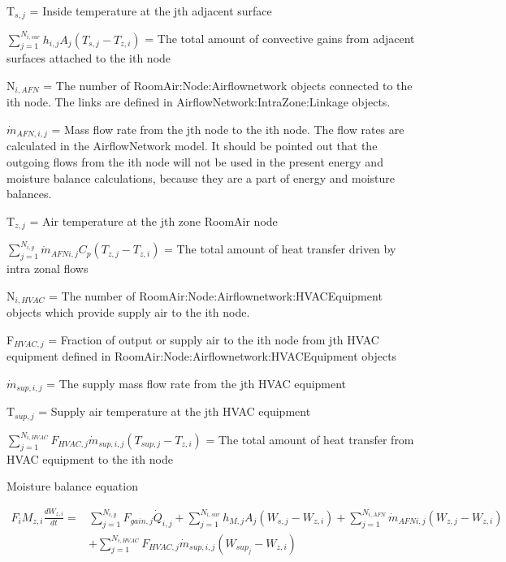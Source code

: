 T\(_{s,j}\) = Inside temperature at the jth adjacent surface

\({\sum\limits_{j = 1}^{N_{i,sur}} h_{i,j} A_j \left( T_{s,j} - T_{z,i}\right)}\) = The total amount of convective gains from adjacent surfaces attached to the ith node

N\(_{i,AFN}\) = The number of RoomAir:Node:Airflownetwork objects connected to the ith node. The links are defined in AirflowNetwork:IntraZone:Linkage objects.

\({\dot m}_{AFN,i,j}\) = Mass flow rate from the jth node to the ith node. The flow rates are calculated in the AirflowNetwork model. It should be pointed out that the outgoing flows from the ith node will not be used in the present energy and moisture balance calculations, because they are a part of energy and moisture balances.

T\(_{z,j}\) = Air temperature at the jth zone RoomAir node

\({\sum\limits_{j = 1}^{N_{i,g}} \dot m_{AFN i,j} {C_p}\left( T_{z,j} - T_{z,i} \right)}\) = The total amount of heat transfer driven by intra zonal flows

N\(_{i,HVAC}\) = The number of RoomAir:Node:Airflownetwork:HVACEquipment objects which provide supply air to the ith node.

F\(_{HVAC,j}\) = Fraction of output or supply air to the ith node from jth HVAC equipment defined in RoomAir:Node:Airflownetwork:HVACEquipment objects

\({\dot m}_{sup,i,j}\) = The supply mass flow rate from the jth HVAC equipment

T\(_{sup,j}\) = Supply air temperature at the jth HVAC equipment

\({\sum\limits_{j = 1}^{N_{i,HVAC}} F_{HVAC,j} \dot m_{sup,i,j} \left( T_{sup,j} - T_{z,i}\right)}\) = The total amount of heat transfer from HVAC equipment to the ith node

Moisture balance equation

\begin{equation}
\begin{split}
{F_i}{M_{z,i}}\frac{{d{W_{z,i}}}}{{dt}} =& \sum\limits_{j = 1}^{{N_{i,g}}} {{F_{gain,j}{\dot Q}_{i,j}}}  + \sum\limits_{j = 1}^{{N_{i,sur}}} {{h_{M,j}}} {A_j}\left( {{W_{s,j}} - {W_{z,i}}} \right) + \sum\limits_{j = 1}^{{N_{i,AFN}}} {{{\dot m}_{AFN i,j}}} \left( {{W_{z,j}} - {W_{z,i}}} \right)\, \\
&+ \sum\limits_{j = 1}^{{N_{i,HVAC}}} {{{F_{HVAC,j}}{\dot m}_{sup,i,j}}} \left( {{W_{sup_j}} - {W_{z,i}}} \right)
\end{split}
\end{equation}

